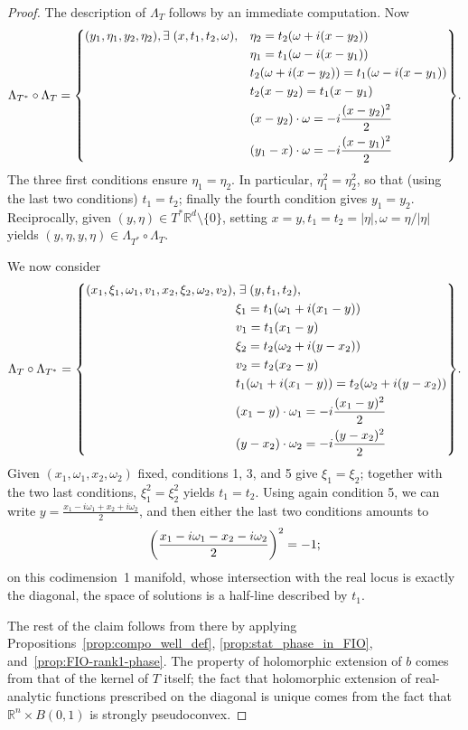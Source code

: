 \documentclass[AHL,Unicode,longabstracts,published]{cedram}
\newcommand\1{\mathds{1}}
\newcommand{\R}{\mathbb{R}}
\let\oldexists\exists
\renewcommand*{\exists}{\mathrel{\oldexists}}
\let\originalleft\left
\let\originalright\right
\renewcommand{\left}{\mathopen{}\mathclose\bgroup\originalleft}
\renewcommand{\right}{\aftergroup\egroup\originalright}
\begin{document}
\begin{proof}
The description of $\Lambda_T$ follows by an immediate computation. Now
\begin{align*}
\Lambda_{T^*}\circ \Lambda_T=\left\{
\begin{aligned}
(y_1,\eta_1,y_2,\eta_2),\exists (x,t_1,t_2,\omega),\quad &\eta_2=t_2(\omega+i(x-y_2))\\
&\eta_1=t_1(\omega-i(x-y_1))\\
&t_2(\omega+i(x-y_2))=t_1(\omega-i(x-y_1))\\
&t_2(x-y_2)=t_1(x-y_1)\\
&(x-y_2)\cdot \omega=-i\frac{(x-y_2)^2}{2}\\
&(y_1-x)\cdot \omega=-i\frac{(x-y_1)^2}{2}
\end{aligned}
\right\}.
\end{align*}
The three first conditions ensure $\eta_1=\eta_2$. In particular, $\eta_1^2=\eta_2^2$, so that (using the last two conditions) $t_1=t_2$; finally the fourth condition gives $y_1=y_2$. Reciprocally, given $(y,\eta)\in T^*\R^d\setminus \{0\}$, setting $x=y,t_1=t_2=|\eta|,\omega=\eta/|\eta|$ yields $(y,\eta,y,\eta)\in \Lambda_{T^*}\circ \Lambda_T$.

We now consider
\begin{align*}
\Lambda_{T}\circ \Lambda_{T^*}=
\left\{
\begin{aligned}
(x_1,\xi_1,\omega_1,v_1,x_2,\xi_2,\omega_2,v_2),&\exists (y,t_1,t_2),\,\\
&\xi_1=t_1(\omega_1+i(x_1-y))\\
&v_1=t_1(x_1-y)\\
&\xi_2=t_2(\omega_2+i(y-x_2))\\
&v_2=t_2(x_2-y)\\
&t_1(\omega_1+i(x_1-y))=t_2(\omega_2+i(y-x_2))\\
&(x_1-y)\cdot \omega_1=-i\frac{(x_1-y)^2}{2}\\
&(y-x_2)\cdot \omega_2=-i\frac{(y-x_2)^2}{2}
\end{aligned}
\right\}.
\end{align*}
Given $(x_1,\omega_1,x_2,\omega_2)$ fixed, conditions 1, 3, and 5 give $\xi_1=\xi_2$; together with the two last conditions, $\xi_1^2=\xi_2^2$ yields $t_1=t_2$. Using again condition 5, we can write $y=\frac{x_1-i\omega_1+x_2+i\omega_2}{2}$, and then either the last two conditions amounts to
\[
\left(\frac{x_1-i\omega_1-x_2-i\omega_2}{2}\right)^2=-1;
\]
on this codimension~1 manifold, whose intersection with the real locus is exactly the diagonal, the space of solutions is a half-line described by $t_1$.



The rest of the claim follows from there by applying Propositions~\ref{prop:compo_well_def}, \ref{prop:stat_phase_in_FIO}, and~\ref{prop:FIO-rank1-phase}. The property of holomorphic extension of $b$ comes from that of the kernel of $T$ itself; the fact that holomorphic extension of real-analytic functions prescribed on the diagonal is unique comes from the fact that $\R^n\times B(0,1)$ is strongly pseudoconvex.
\end{proof}
\end{document}
